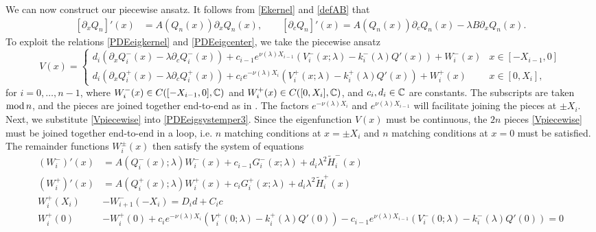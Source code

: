 \documentclass[10pt,reqno]{amsart}
\theoremstyle{plain}
\theoremstyle{definition}
\theoremstyle{remark}
\numberwithin{theorem}{section}
\numberwithin{equation}{section}
\begin{document}
We can now construct our piecewise ansatz. It follows from \cref{Ekernel} and \cref{defAB} that
\begin{equation}\label{PDEeigkernel}
\begin{aligned}
{[\partial_x Q_n]}'(x) &= A(Q_n(x))\partial_x Q_n(x), \qquad
{[\partial_c Q_n]}'(x) = A(Q_n(x))\partial_c Q_n(x) - \lambda B \partial_x Q_n(x).
\end{aligned}
\end{equation}
To exploit the relations \eqref{PDEeigkernel} and \eqref{PDEeigcenter}, we take the piecewise ansatz
\begin{equation}\label{Vpiecewise}
V(x) = \begin{cases}
d_i (\partial_x Q_i^-(x) - \lambda \partial_c Q_i^-(x)) + c_{i-1} e^{\nu(\lambda)X_{i-1} }( V_i^-(x; \lambda) - k_i^-(\lambda) Q'(x) ) + W_i^-(x) & x \in [-X_{i-1}, 0] \\
d_i (\partial_x Q_i^+(x) - \lambda \partial_c Q_i^+(x)) + c_i e^{-\nu(\lambda)X_i }( V_i^+(x; \lambda) - k_i^+(\lambda) Q'(x) ) + W_i^+(x) & x \in [0, X_i],
\end{cases}
\end{equation}
for $i = 0, \dots, n-1$, where $W_i^-(x) \in C([-X_{i-1}, 0], \mathbb{C})$ and $W_i^+(x) \in C([0, X_i], \mathbb{C})$, and $c_i, d_i \in \mathbb{C}$ are constants. The subscripts are taken $\mathop\mathrm{mod}\nolimits n$, and the pieces are joined together end-to-end as in \cite{Sandstede1998}. The factors $e^{-\nu(\lambda)X_i}$ and $e^{\nu(\lambda)X_{i-1}}$ will facilitate joining the pieces at $\pm X_i$. Next, we substitute \cref{Vpiecewise} into \cref{PDEeigsystemper3}. Since the eigenfunction $V(x)$ must be continuous, the $2n$ pieces \cref{Vpiecewise} must be joined together end-to-end in a loop, i.e. $n$ matching conditions at $x = \pm X_i$ and $n$ matching conditions at $x = 0$ must be satisfied. The remainder functions $W_i^\pm(x)$ then satisfy the system of equations
\begin{equation}\label{eigsystem0}
\begin{aligned}
(W_i^-)'(x) &= A(Q_i^-(x); \lambda) W_i^-(x) + c_{i-1} G_i^-(x; \lambda) + d_i \lambda^2 \tilde{H}_i^-(x) \\
(W_i^+)'(x) &= A(Q_i^+(x); \lambda) W_i^+(x) + c_i G_i^+(x; \lambda) + d_i \lambda^2 \tilde{H}_i^+(x) \\
W_i^+(X_i) &- W_{i+1}^-(-X_i) = D_i d + C_i c \\
W_i^+(0) &- W_i^+(0) + c_i e^{-\nu(\lambda)X_i}(V_i^+(0; \lambda) - k_i^+(\lambda) Q'(0) )  - c_{i-1} e^{\nu(\lambda)X_{i-1}} ( V_i^-(0; \lambda) - k_i^-(\lambda) Q'(0) ) = 0
\end{aligned}
\end{equation}
\end{document}
